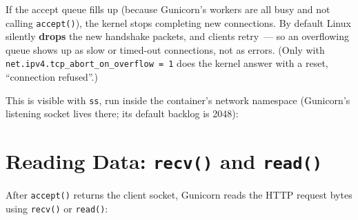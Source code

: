 \noindent{}If the accept queue fills up (because Gunicorn's workers are all busy and not calling \texttt{accept()}), the kernel stops completing new connections. By default Linux silently \textbf{drops} the new handshake packets, and clients retry~--- so an overflowing queue shows up as slow or timed-out connections, not as errors. (Only with \texttt{net.}\allowbreak{}\texttt{ipv4.}\allowbreak{}\texttt{tcp\_}\allowbreak{}\texttt{abort\_}\allowbreak{}\texttt{on\_}\allowbreak{}\texttt{overflow\ =}\allowbreak{}\texttt{\ 1} does the kernel answer with a reset, ``connection refused''.)

This is visible with \texttt{ss}, run inside the container's network namespace (Gunicorn's listening socket lives there; its default backlog is 2048):

\begin{codebox}[short]

\begin{Shaded}
\begin{Highlighting}[]
 \VariableTok{$(} \VariableTok{)} 
\end{Highlighting}
\end{Shaded}

\end{codebox}

\setcounter{section}{2}
\section{\texorpdfstring{Reading Data: \texttt{recv()} and \texttt{read()}}{Reading Data: recv() and read()}}\label{30-kernel-application-handoff:303-reading-data-recv-and-read}

After \texttt{accept()} returns the client socket, Gunicorn reads the HTTP request bytes using \texttt{recv()} or \texttt{read()}:

